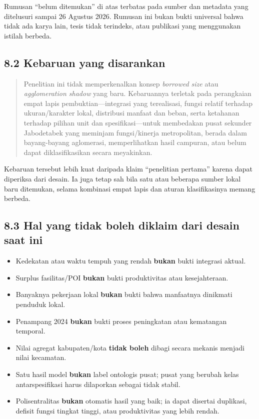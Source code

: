 \documentclass[
  indonesian,
  11pt,
  a4paper,
  oneside,
  openany]{report}
\providecommand{\tightlist}{%
  \setlength{\itemsep}{0pt}\setlength{\parskip}{0pt}}
\begin{document}
Rumusan ``belum ditemukan'' di atas terbatas pada sumber dan metadata
yang ditelusuri sampai 26 Agustus 2026. Rumusan ini bukan bukti
universal bahwa tidak ada karya lain, tesis tidak terindeks, atau
publikasi yang menggunakan istilah berbeda.

\subsection{8.2 Kebaruan yang
disarankan}\label{kebaruan-yang-disarankan}

\begin{quote}
Penelitian ini tidak memperkenalkan konsep \emph{borrowed size} atau
\emph{agglomeration shadow} yang baru. Kebaruannya terletak pada
perangkaian empat lapis pembuktian---integrasi yang terealisasi, fungsi
relatif terhadap ukuran/karakter lokal, distribusi manfaat dan beban,
serta ketahanan terhadap pilihan unit dan spesifikasi---untuk membedakan
pusat sekunder Jabodetabek yang meminjam fungsi/kinerja metropolitan,
berada dalam bayang-bayang aglomerasi, memperlihatkan hasil campuran,
atau belum dapat diklasifikasikan secara meyakinkan.
\end{quote}

Kebaruan tersebut lebih kuat daripada klaim ``penelitian pertama''
karena dapat diperiksa dari desain. Ia juga tetap sah bila satu atau
beberapa sumber lokal baru ditemukan, selama kombinasi empat lapis dan
aturan klasifikasinya memang berbeda.

\subsection{8.3 Hal yang tidak boleh diklaim dari desain saat
ini}\label{hal-yang-tidak-boleh-diklaim-dari-desain-saat-ini}

\begin{itemize}
\tightlist
\item
  Kedekatan atau waktu tempuh yang rendah \textbf{bukan} bukti integrasi
  aktual.
\item
  Surplus fasilitas/POI \textbf{bukan} bukti produktivitas atau
  kesejahteraan.
\item
  Banyaknya pekerjaan lokal \textbf{bukan} bukti bahwa manfaatnya
  dinikmati penduduk lokal.
\item
  Penampang 2024 \textbf{bukan} bukti proses peningkatan atau kematangan
  temporal.
\item
  Nilai agregat kabupaten/kota \textbf{tidak boleh} dibagi secara
  mekanis menjadi nilai kecamatan.
\item
  Satu hasil model \textbf{bukan} label ontologis pusat; pusat yang
  berubah kelas antarspesifikasi harus dilaporkan sebagai tidak stabil.
\item
  Polisentralitas \textbf{bukan} otomatis hasil yang baik; ia dapat
  disertai duplikasi, defisit fungsi tingkat tinggi, atau produktivitas
  yang lebih rendah.
\end{itemize}
\end{document}
